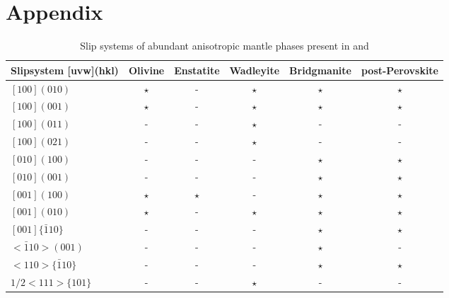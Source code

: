 \chapter{Appendix}
\label{chapter:appendix}

\begin{table}[h!]
\caption{Slip systems of abundant anisotropic mantle phases present in \drexstitle{} and \drexmtitle{}}
\centering
\begin{tabular}{|>{\small}p{3.5cm} |c|c|c|c|c|} 
 \hline
 \normalsize{Slip\quad system [uvw](hkl)} & Olivine & Enstatite & Wadleyite & Bridgmanite & post-Perovskite\\ [0.5ex] 
 \hline\hline
 $[100](010)$ & $\star$ & - & $\star$ & $\star$ & $\star$ \\\hline
 $[100](001)$ & $\star$ & - & $\star$ & $\star$ & $\star$ \\\hline
 $[100](011)$ & - & - & $\star$ & - & -\\\hline
 $[100](021)$ & - & - & $\star$ & - & -\\\hline
 $[010](100)$ & - & - & - & $\star$ & $\star$ \\\hline
 $[010](001)$ & - & - & - & $\star$ & $\star$ \\\hline
 $[001](100)$ & $\star$ & $\star$ & - & $\star$ & $\star$ \\\hline
 $[001](010)$ & $\star$ & - & $\star$ & $\star$ & $\star$ \\\hline
 $[001]\{\bar{1}10\}$ & - & - & - & $\star$ & $\star$ \\\hline
 $<\!\bar{1}10\!>\!(001)$ & - & - & - & $\star$ & -\\\hline
 $<\!110\!>\!\{\bar{1}10\}$ & - & - & - & $\star$ & $\star$ \\\hline
 $1/2\!<\!111\!>\!\{101\}$ & - & - & $\star$ & - & -\\\hline
\end{tabular}
\label{table:1}
\end{table}

